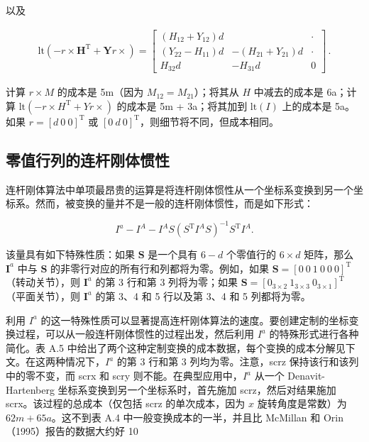 \documentclass[10pt,a4paper]{book}
\theoremstyle{thmstyle} %
\theoremstyle{defstyle} %
\theoremstyle{prostyle} %
\begin{document}
以及



$$
\begin{array}{r} { \mathrm { l t } ( - r \times \boldsymbol{ H } ^{\mathrm { T} } + \boldsymbol{ Y } r \times ) = \left[ \begin{array}{lll} { ( H _ { 12 } + Y _ { 12 } ) d } & { } & { \cdot } \\{ ( Y _ { 22 } - H _ { 11 } ) d } & { - ( H _ { 21 } + Y _ { 21 } ) d } & { \cdot } \\{ H _ { 32 } d } & { - H _ { 31 } d } & { 0 } \end{array} \right] \, . } \end{array}
$$



计算 $r \times M$ 的成本是 5m（因为 $M_{12} = M_{21}$）；将其从 $H$ 中减去的成本是 6a；计算 $\text{lt}(-r \times H^{\text{T}} + Yr \times)$ 的成本是 5m + 3a；将其加到 $\text{lt}(I)$ 上的成本是 5a。如果 $r = [d \ 0 \ 0]^{\text{T}}$ 或 $[0 \ d \ 0]^{\text{T}}$，则细节将不同，但成本相同。



\subsection{零值行列的连杆刚体惯性}





连杆刚体算法中单项最昂贵的运算是将连杆刚体惯性从一个坐标系变换到另一个坐标系。然而，被变换的量并不是一般的连杆刚体惯性，而是如下形式：



$$
I ^{a} - I ^{A} - I ^{A} S ( S ^{\mathrm { T} } I ^{A} S ) ^{- 1} S ^{\mathrm { T} } I ^{A} .
$$



该量具有如下特殊性质：如果 $\boldsymbol{S}$ 是一个具有 $6-d$ 个零值行的 $6 \times d$ 矩阵，那么 $\boldsymbol{I}^{a}$ 中与 $\boldsymbol{S}$ 的非零行对应的所有行和列都将为零。例如，如果 $\boldsymbol{S} = [0 \ 0 \ 1 \ 0 \ 0 \ 0]^{\text{T}}$（转动关节），则 $\boldsymbol{I}^{a}$ 的第 3 行和第 3 列将为零；如果 $\boldsymbol{S} = [0_{3 \times 2} \ 1_{3 \times 3} \ 0_{3 \times 1}]^{\text{T}}$（平面关节），则 $\boldsymbol{I}^{a}$ 的第 3、4 和 5 行以及第 3、4 和 5 列都将为零。



利用 $I^{a}$ 的这一特殊性质可以显著提高连杆刚体算法的速度。要创建定制的坐标变换过程，可以从一般连杆刚体惯性的过程出发，然后利用 $I^{a}$ 的特殊形式进行各种简化。表 A.5 中给出了两个这种定制变换的成本数据，每个变换的成本分解见下文。在这两种情况下，$I^{a}$ 的第 3 行和第 3 列均为零。注意，scrz 保持该行和该列中的零不变，而 scrx 和 scry 则不能。在典型应用中，$I^{a}$ 从一个 Denavit-Hartenberg 坐标系变换到另一个坐标系时，首先施加 scrz，然后对结果施加 scrx。该过程的总成本（仅包括 scrz 的单次成本，因为 $x$ 旋转角度是常数）为 $62m+65a$。这不到表 A.4 中一般变换成本的一半，并且比 McMillan 和 Orin（1995）报告的数据大约好 10%
\end{document}
